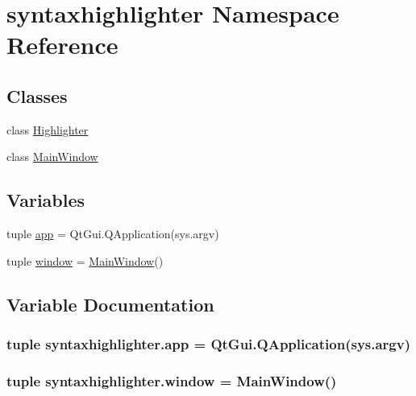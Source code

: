 \hypertarget{namespacesyntaxhighlighter}{}\section{syntaxhighlighter Namespace Reference}
\label{namespacesyntaxhighlighter}
\subsection*{Classes}
\begin{DoxyCompactItemize}
\item 
class \hyperlink{classsyntaxhighlighter_1_1Highlighter}{Highlighter}
\item 
class \hyperlink{classsyntaxhighlighter_1_1MainWindow}{Main\+Window}
\end{DoxyCompactItemize}
\subsection*{Variables}
\begin{DoxyCompactItemize}
\item 
tuple \hyperlink{namespacesyntaxhighlighter_a21e98b2148fdef9e80ce756a1aeced24}{app} = Qt\+Gui.\+Q\+Application(sys.\+argv)
\item 
tuple \hyperlink{namespacesyntaxhighlighter_a621d6a31666d8a8fc8e4ace233442917}{window} = \hyperlink{classsyntaxhighlighter_1_1MainWindow}{Main\+Window}()
\end{DoxyCompactItemize}


\subsection{Variable Documentation}
\hypertarget{namespacesyntaxhighlighter_a21e98b2148fdef9e80ce756a1aeced24}{}
\subsubsection[{app}]{\setlength{\rightskip}{0pt plus 5cm}tuple syntaxhighlighter.\+app = Qt\+Gui.\+Q\+Application(sys.\+argv)}\label{namespacesyntaxhighlighter_a21e98b2148fdef9e80ce756a1aeced24}
\hypertarget{namespacesyntaxhighlighter_a621d6a31666d8a8fc8e4ace233442917}{}
\subsubsection[{window}]{\setlength{\rightskip}{0pt plus 5cm}tuple syntaxhighlighter.\+window = {\bf Main\+Window}()}\label{namespacesyntaxhighlighter_a621d6a31666d8a8fc8e4ace233442917}
